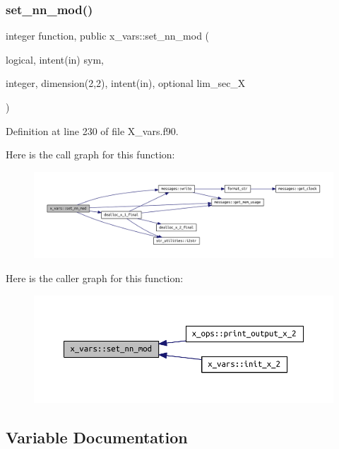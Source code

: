 \subsubsection{\texorpdfstring{set\+\_\+nn\+\_\+mod()}{set\_nn\_mod()}}
{\footnotesize\ttfamily integer function, public x\+\_\+vars\+::set\+\_\+nn\+\_\+mod (\begin{DoxyParamCaption}\item[{logical, intent(in)}]{sym,  }\item[{integer, dimension(2,2), intent(in), optional}]{lim\+\_\+sec\+\_\+X }\end{DoxyParamCaption})}



Definition at line 230 of file X\+\_\+vars.\+f90.

Here is the call graph for this function\+:
\nopagebreak
\begin{figure}[H]
\begin{center}
\leavevmode
\includegraphics[width=350pt]{namespacex__vars_a90d744aee4358a8cc35d29304d1bb120_cgraph}
\end{center}
\end{figure}
Here is the caller graph for this function\+:
\nopagebreak
\begin{figure}[H]
\begin{center}
\leavevmode
\includegraphics[width=350pt]{namespacex__vars_a90d744aee4358a8cc35d29304d1bb120_icgraph}
\end{center}
\end{figure}


\subsection{Variable Documentation}
\mbox{\label{namespacex__vars_a23179dd22962147dfd992e800f0dfcc4}} 
